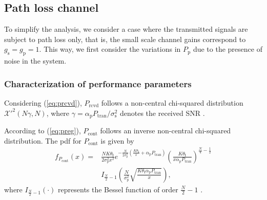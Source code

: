 \documentclass[conference, twocolumn]{IEEEtran}
\newcommand{\q}[2]{{\mathcal Q}_{#1}\left( #2 \right)}
\newcommand{\sub}[1]{_{\text{#1}}}
\newcommand{\preg}{P\sub{cont}}
\newcommand{\prcvd}{P\sub{rcvd}}
\newcommand{\ptran}{P\sub{tran}}
\newcommand{\pp}{P\sub{p}}
\newcommand{\ite}{\theta\sub{I}}
\newcommand{\gp}{g\sub{p}}
\newcommand{\gs}{g\sub{s}}
\newcommand{\ap}{\alpha\sub{p}}
\newcommand{\npp}{\sigma^2\sub{p}}
\newcommand{\nps}{\sigma^2\sub{s}}
\newcommand{\fpreg}{F_{\preg}}
\newcommand{\dprcvd}{f_{\prcvd}}
\newcommand{\dpreg}{f_{\preg}}
\begin{document}
\subsection{Path loss channel}
To simplify the analysis, we consider a case where the transmitted signals are subject to path loss only, that is, the small scale channel gains correspond to $\gs = \gp = 1$. This way, we first consider the variations in $\pp$ due to the presence of noise in the system. 

\subsubsection*{Characterization of performance parameters}
 
Considering (\ref{eq:prcvd}), $\prcvd$ follows a non-central chi-squared distribution $\mathcal{X'}^2(N \gamma, N)$, where $\gamma = \ap \ptran/\nps$ denotes the received SNR \cite{Urkowitz}. 

According to (\ref{eq:preg}), $\preg$ follows an inverse non-central chi-squared distribution. The pdf for $\preg$  is given by  
\begin{align}
\dpreg(x) =& \frac{N K \ite}{2\npp x^2} e^{- \frac{N}{2 \npp}\left( \frac{K  \ite}{x} + \ap \ptran \right)} \left( \frac{K \ite}{x \ap \ptran}   \right)^{\frac{N}{4} - \frac{1}{2}} \label{eq:dpreg_pl} \\
\quad & I_{\frac{N}{2}  - 1}\left( \frac{N}{\npp} \sqrt{\frac{ K \ite \ap \ptran}{x}}  \right), \nonumber
\end{align}
where $I_{\frac{N}{2}  - 1}(\cdot)$ represents the Bessel function of order $\frac{N}{2} - 1$ \cite{grad}.
\end{document}
